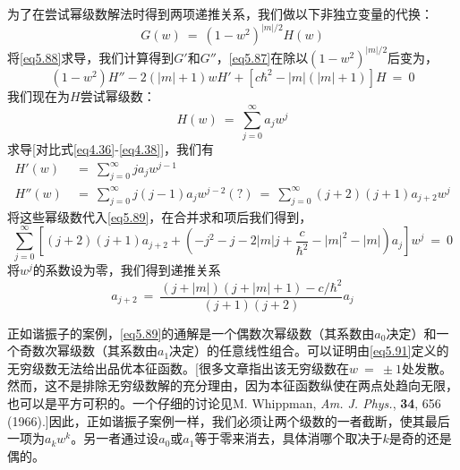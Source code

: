 \documentclass[12pt,a4paper,openany]{ctexbook}
\newcommand{\abs}[1]{\left| #1 \right|}
\newcommand{\paren}[1]{\left( #1 \right)}
\begin{document}
\begin{flushleft}
{\begin{list}{}{%
    \setlength{\leftmargin}{0pt}  %
    \setlength{\rightmargin}{0pt}
    \setlength{\textwidth}{0.6\textwidth}  %
  }
    为了在尝试幂级数解法时得到两项递推关系，我们做以下非独立变量的代换：
    \begin{equation}
        G(w)\ =\ (1-w^2)^{\abs{m}/2}H(w) \label{eq5.88}
    \end{equation}
    将\eqref{eq5.88}求导，我们计算得到$G'$和$G''$，\eqref{eq5.87}在除以$(1-w^2)^{\abs{m}/2}$后变为，
    \begin{equation}
        (1-w^2)H''-2(\abs{m}+1)wH'+[c\hbar^2-\abs{m}(\abs{m}+1)]H\ =\ 0 \label{eq5.89}
    \end{equation}
    我们现在为$H$尝试幂级数：
    \begin{equation}
        H(w)\ =\ \sum_{j=0}^{\infty}a_jw^j \label{eq5.90}
    \end{equation}
    求导[对比式\eqref{eq4.36}-\eqref{eq4.38}]，我们有
    \begin{align*}
        H'(w)\ &=\ \sum_{j=0}^{\infty}ja_jw^{j-1} \\
        H''(w)\ &=\ \sum_{j=0}^{\infty}j(j-1)a_jw^{j-2}(?)\ =\ \sum_{j=0}^{\infty}(j+2)(j+1)a_{j+2}w^j
    \end{align*}
    将这些幂级数代入\eqref{eq5.89}，在合并求和项后我们得到，
    \begin{equation*}
        \sum_{j=0}^{\infty}\left[(j+2)(j+1)a_{j+2}+\paren{-j^2-j-2\abs{m}j+\frac{c}{\hbar^2}-\abs{m}^2-\abs{m}}a_j\right]w^j\ =\ 0
    \end{equation*}
    将$w^j$的系数设为零，我们得到递推关系
    \begin{equation}
        a_{j+2}\ =\ \frac{(j+\abs{m})(j+\abs{m}+1)-c/\hbar^2}{(j+1)(j+2)}a_j \label{eq5.91}
    \end{equation}
  \end{list}
\par}  %

正如谐振子的案例，\eqref{eq5.89}的通解是一个偶数次幂级数（其系数由$a_0$决定）和一个奇数次幂级数（其系数由$a_1$决定）的任意线性组合。可以证明由\eqref{eq5.91}定义的无穷级数无法给出品优本征函数。[很多文章指出该无穷级数在$w\ =\ \pm1$处发散。然而，这不是排除无穷级数解的充分理由，因为本征函数纵使在两点处趋向无限，也可以是平方可积的。一个仔细的讨论见M. Whippman, \textit{Am. J. Phys.}, \textbf{34}, 656 (1966).]因此，正如谐振子案例一样，我们必须让两个级数的一者截断，使其最后一项为$a_kw^k$。另一者通过设$a_0$或$a_1$等于零来消去，具体消哪个取决于$k$是奇的还是偶的。


\end{flushleft}
\end{document}
